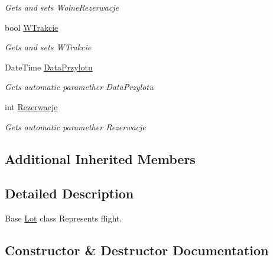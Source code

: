 \begin{DoxyCompactItemize}
\begin{DoxyCompactList}\small\item\em Gets and sets Wolne\+Rezerwacje \end{DoxyCompactList}\item 
bool \mbox{\hyperlink{class_silnik_1_1_lot_a8246b195b85797bb116d4b1ac61c8082}{W\+Trakcie}}
\begin{DoxyCompactList}\small\item\em Gets and sets W\+Trakcie \end{DoxyCompactList}\item 
Date\+Time \mbox{\hyperlink{class_silnik_1_1_lot_ac3b72a8fbb28b3dbbab0849caeec3aa9}{Data\+Przylotu}}
\begin{DoxyCompactList}\small\item\em Gets automatic paramether Data\+Przylotu \end{DoxyCompactList}\item 
int \mbox{\hyperlink{class_silnik_1_1_lot_a9adba13eadf70435a63a5ecd9ed20cd2}{Rezerwacje}}
\begin{DoxyCompactList}\small\item\em Gets automatic paramether Rezerwacje \end{DoxyCompactList}\end{DoxyCompactItemize}
\subsection*{Additional Inherited Members}


\subsection{Detailed Description}
Base \mbox{\hyperlink{class_silnik_1_1_lot}{Lot}} class Represents flight. 



\subsection{Constructor \& Destructor Documentation}
\mbox{\label{class_silnik_1_1_lot_a6ff9543d81086a250b1c2517135e2499}} 
